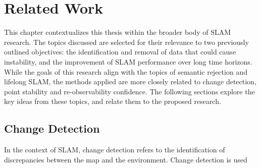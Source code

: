 \section{Related Work}
\label{sec:related_work}

This chapter contextualizes this thesis within the broader body of SLAM research. The topics discussed are selected for their relevance to two previously outlined objectives: the identification and removal of data that could cause instability, and the improvement of SLAM performance over long time horizons. While the goals of this research align with the topics of semantic rejection and lifelong SLAM, the methods applied are more closely related to change detection, point stability and re-observability confidence. The following sections explore the key ideas from these topics, and relate them to the proposed research.

\subsection{Change Detection}

In the context of SLAM, change detection refers to the identification of discrepancies between the map and the environment. Change detection is used 




